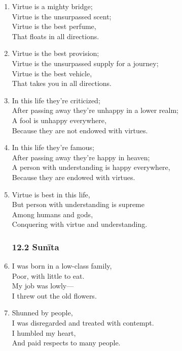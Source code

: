 \documentclass[10pt, openany]{book}
\begin{document}
\begin{enumerate}
\item Virtue is a mighty bridge;\\
Virtue is the unsurpassed scent;\\
Virtue is the best perfume,\\
That floats in all directions.

\item Virtue is the best provision;\\
Virtue is the unsurpassed supply for a journey;\\
Virtue is the best vehicle,\\
That takes you in all directions.

\item In this life they’re criticized;\\
After passing away they’re unhappy in a lower realm;\\
A fool is unhappy everywhere,\\
Because they are not endowed with virtues.

\item In this life they’re famous;\\
After passing away they’re happy in heaven;\\
A person with understanding is happy everywhere,\\
Because they are endowed with virtues.

\item Virtue is best in this life,\\
But person with understanding is supreme\\
Among humans and gods,\\
Conquering with virtue and understanding.

\subsubsection*{12.2 Sunīta}

\item I was born in a low-class family,\\
Poor, with little to eat.\\
My job was lowly—\\
I threw out the old flowers.

\item Shunned by people,\\
I was disregarded and treated with contempt.\\
I humbled my heart,\\
And paid respects to many people.


\end{enumerate}
\end{document}
